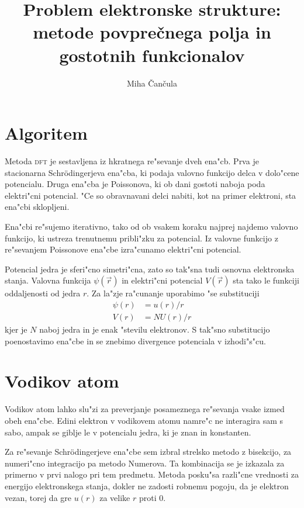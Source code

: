 \documentclass[a4paper,10pt]{article}
\title{Problem elektronske strukture: metode povprečnega polja in gostotnih funkcionalov}
\author{Miha \v Can\v cula}
\begin{document}
\maketitle

\section{Algoritem}

Metoda \textsc{dft} je sestavljena iz hkratnega re"sevanje dveh ena"cb. 
Prva je stacionarna Schr\"odingerjeva ena"cba, ki podaja valovno funkcijo delca v dolo"cene potencialu. 
Druga ena"cba je Poissonova, ki ob dani gostoti naboja poda elektri"cni potencial.
"Ce so obravnavani delci nabiti, kot na primer elektroni, sta ena"cbi sklopljeni. 

Ena"cbi re"sujemo iterativno, tako od ob vsakem koraku najprej najdemo valovno funkcijo, ki ustreza trenutnemu pribli"zku za potencial. 
Iz valovne funkcijo z re"sevanjem Poissonove ena"cbe izra"cunamo elektri"cni potencial. 

Potencial jedra je sferi"cno simetri"cna, zato so tak"sna tudi osnovna elektronska stanja. 
Valovna funkcija $\psi(\vec r)$ in elektri"cni potencial $V(\vec r)$ sta tako le funkciji oddaljenosti od jedra $r$. 
Za la"zje ra"cunanje uporabimo "se substituciji
\begin{align}
 \psi(r) &= u(r)/r \\
 V(r) &= NU(r)/r
\end{align}
kjer je $N$ naboj jedra in je enak "stevilu elektronov.
S tak"sno substitucijo poenostavimo ena"cbe in se znebimo divergence potenciala v izhodi"s"cu. 

\section{Vodikov atom}

Vodikov atom lahko slu"zi za preverjanje posameznega re"sevanja vsake izmed obeh ena"cbe. 
Edini elektron v vodikovem atomu namre"c ne interagira sam s sabo, ampak se giblje le v potencialu jedra, ki je znan in konstanten. 

Za re"sevanje Schr\"odingerjeve ena"cbe sem izbral strelsko metodo z bisekcijo, za numeri"cno integracijo pa metodo Numerova. 
Ta kombinacija se je izkazala za primerno v prvi nalogo pri tem predmetu. 
Metoda posku"sa razli"cne vrednosti za energijo elektronskega stanja, dokler ne zadosti robnemu pogoju, da je elektron vezan, torej da gre $u(r)$ za velike $r$ proti 0. 
\end{document}
